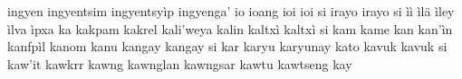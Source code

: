 ingyen\hspace{2mm}
ingyentsim\hspace{2mm}
ingyentsyìp\hspace{2mm}
ingyenga'\hspace{2mm}
io\hspace{2mm}
ioang\hspace{2mm}
ioi\hspace{2mm}
ioi si\hspace{2mm}
irayo\hspace{2mm}
irayo si\hspace{2mm}
ìì\hspace{2mm}
ìlä\hspace{2mm}
ìley\hspace{2mm}
ìlva\hspace{2mm}
ìpxa\hspace{2mm}
ka\hspace{2mm}
kakpam\hspace{2mm}
kakrel\hspace{2mm}
kali'weya\hspace{2mm}
kalin\hspace{2mm}
kaltxì\hspace{2mm}
kaltxì si\hspace{2mm}
kam\hspace{2mm}
kame\hspace{2mm}
kan\hspace{2mm}
kan'ìn\hspace{2mm}
kanfpìl\hspace{2mm}
kanom\hspace{2mm}
kanu\hspace{2mm}
kangay\hspace{2mm}
kangay si\hspace{2mm}
kar\hspace{2mm}
karyu\hspace{2mm}
karyunay\hspace{2mm}
kato\hspace{2mm}
kavuk\hspace{2mm}
kavuk si\hspace{2mm}
kaw'it\hspace{2mm}
kawkrr\hspace{2mm}
kawng\hspace{2mm}
kawnglan\hspace{2mm}
kawngsar\hspace{2mm}
kawtu\hspace{2mm}
kawtseng\hspace{2mm}
kay\hspace{2mm}
